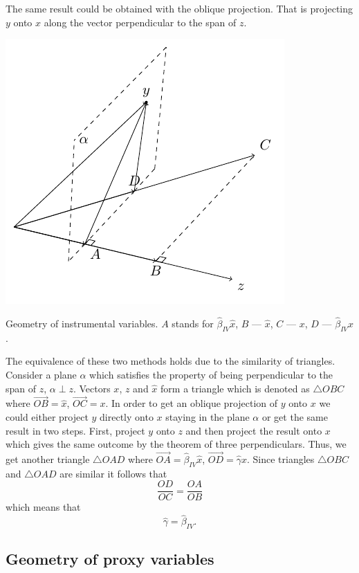 The same result could be obtained with the oblique projection.
That is projecting $y$ onto $x$ along the vector perpendicular to the span of $z$.

\begin{marginfigure}[10\baselineskip]
\includegraphics[scale=0.85]{figures/02_instr.pdf}
\caption{Geometry of instrumental variables. $A$ stands for $\hat \beta_{IV} \hat x$,
$B$ — $\hat x$, $C$ — $x$, $D$ — $\hat \beta_{IV} x$.}
\label{fig:instrumental}
\end{marginfigure}

The equivalence of these two methods holds due to the similarity of triangles.
Consider a plane $\alpha$ which satisfies the property of being perpendicular
to the span of $z$, $\alpha \perp z$.
Vectors $x$, $z$ and $\hat x$ form a triangle which is denoted as $\bigtriangleup OBC$
where $\overrightarrow{OB} = \hat{x}$, $\overrightarrow{OC} = x$.
In order to get an oblique projection of $y$ onto $x$ we could either
project $y$ directly onto $x$ staying in the plane $\alpha$
or get the same result in two steps. First, project $y$ onto $z$
and then project the result onto $x$ which gives the same outcome
by the theorem of three perpendiculars. Thus, we get another triangle $\bigtriangleup OAD$
where $\overrightarrow{OA} = \hat \beta_{IV} \hat x$, $\overrightarrow{OD} = \hat \gamma x$.
Since triangles $\bigtriangleup OBC$ and $\bigtriangleup OAD$ are similar
it follows that
\[
\frac{OD}{OC} = \frac{OA}{OB}
\]
which means that
\[
\hat \gamma = \hat \beta_{IV}.
\]


\subsection{Geometry of proxy variables}

